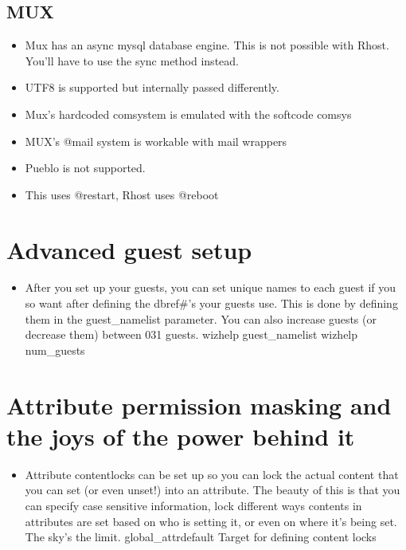 \documentclass[letterpaper,10pt,english]{sphinxmanual}
\begin{document}
\subsection{MUX}
\label{\detokenize{12-advanced:mux}}\begin{itemize}
\item {} 
\sphinxAtStartPar
Mux has an async mysql database engine.  This is not possible
with Rhost.  You’ll have to use the sync method instead.

\item {} 
\sphinxAtStartPar
UTF8 is supported but internally passed differently.

\item {} 
\sphinxAtStartPar
Mux’s hardcoded comsystem is emulated with the softcode comsys

\item {} 
\sphinxAtStartPar
MUX’s @mail system is workable with mail wrappers

\item {} 
\sphinxAtStartPar
Pueblo is not supported.

\item {} 
\sphinxAtStartPar
This uses @restart, Rhost uses @reboot

\end{itemize}


\section{Advanced guest setup}
\label{\detokenize{12-advanced:advanced-guest-setup}}\begin{itemize}
\item {} 
\sphinxAtStartPar
After you set up your guests, you can set unique names to each guest
if you so want after defining the dbref\#’s your guests use.  This is
done by defining them in the guest\_namelist parameter.  You can also
increase guests (or decrease them) between 0\sphinxhyphen{}31 guests.
\sphinxhyphen{} wizhelp guest\_namelist
\sphinxhyphen{} wizhelp num\_guests

\end{itemize}


\section{Attribute permission masking and the joys of the power behind it}
\label{\detokenize{12-advanced:attribute-permission-masking-and-the-joys-of-the-power-behind-it}}\begin{itemize}
\item {} 
\sphinxAtStartPar
Attribute contentlocks can be set up so you can lock the actual
content that you can set (or even unset!) into an attribute.
The beauty of this is that you can specify case sensitive
information, lock different ways contents in attributes are set
based on who is setting it, or even on where it’s being set.
The sky’s the limit.
\sphinxhyphen{} global\_attrdefault    \sphinxhyphen{} Target for defining content locks

\end{itemize}
\end{document}
